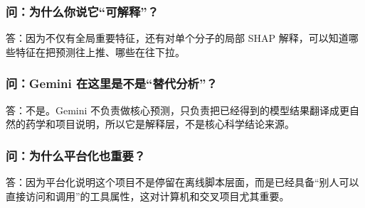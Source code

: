 \documentclass[
  ,
]{ctexart}
\begin{document}
\hypertarget{ux95eeux4e3aux4ec0ux4e48ux4f60ux8bf4ux5b83ux53efux89e3ux91ca}{%
\subsubsection{问：为什么你说它``可解释''？}\label{ux95eeux4e3aux4ec0ux4e48ux4f60ux8bf4ux5b83ux53efux89e3ux91ca}}

答：因为不仅有全局重要特征，还有对单个分子的局部 SHAP
解释，可以知道哪些特征在把预测往上推、哪些在往下拉。

\hypertarget{ux95eegemini-ux5728ux8fd9ux91ccux662fux4e0dux662fux66ffux4ee3ux5206ux6790}{%
\subsubsection{问：Gemini
在这里是不是``替代分析''？}\label{ux95eegemini-ux5728ux8fd9ux91ccux662fux4e0dux662fux66ffux4ee3ux5206ux6790}}

答：不是。Gemini
不负责做核心预测，只负责把已经得到的模型结果翻译成更自然的药学和项目说明，所以它是解释层，不是核心科学结论来源。

\hypertarget{ux95eeux4e3aux4ec0ux4e48ux5e73ux53f0ux5316ux4e5fux91cdux8981}{%
\subsubsection{问：为什么平台化也重要？}\label{ux95eeux4e3aux4ec0ux4e48ux5e73ux53f0ux5316ux4e5fux91cdux8981}}

答：因为平台化说明这个项目不是停留在离线脚本层面，而是已经具备``别人可以直接访问和调用''的工具属性，这对计算机和交叉项目尤其重要。
\end{document}
